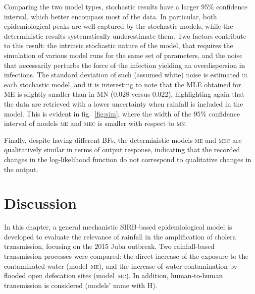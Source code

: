 Comparing the two model types, stochastic results have a larger 95\% confidence interval, which better encompass most of the data. In particular, both epidemiological peaks are well captured by the stochastic models, while the deterministic results systematically underestimate them. Two factors contribute to this result: the intrinsic stochastic nature of the model, that requires the simulation of various model runs for the same set of parameters, and the noise that necessarily perturbs the force of the infection yielding an overdispersion in infections. The standard deviation of such (assumed white) noise is estimated in each stochastic model, and it is interesting to note that the MLE obtained for \textsc{ME} is slightly smaller than in \textsc{MN} (0.028 versus 0.022), highlighting again that the data are retrieved with a lower uncertainty when rainfall is included in the model. This is evident in fig.~\ref{fig:sim}, where the width of the 95\% confidence interval of models \textsc{me} and \textsc{mec} is smaller with respect to \textsc{mn}.

Finally, despite having different BFs, the deterministic models \textsc{me} and \textsc{mec} are qualitatively similar in terms of output response, indicating that the recorded changes in the log-likelihood function do not correspond to qualitative changes in the output.

\section{Discussion}
\label{sec:disc}

In this chapter, a general mechanistic SIRB-based epidemiological model is developed to evaluate the relevance of rainfall in the amplification of cholera transmission, focusing on the 2015 Juba outbreak. Two rainfall-based transmission processes were compared: the direct increase of the exposure to the contaminated water (model~\textsc{me})\cite{Eisenberg:ExaminingRainfallCholera:2013}, and the increase of water contamination by flooded open defecation sites (model~\textsc{mc})\cite{Rinaldo:Reassessment20102011:2012}. In addition, human-to-human transmission is considered (models' name with \textsc{H}).

